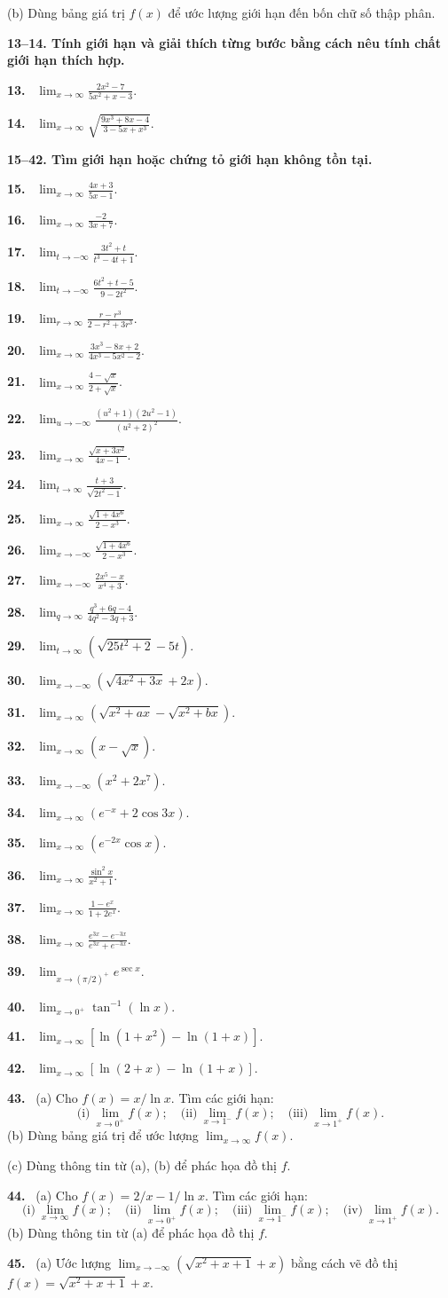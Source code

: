 \documentclass[12pt,a4paper]{article}
\newcommand{\bt}[1]{\par\smallskip\noindent\textbf{#1.}\ }
\newcommand{\group}[1]{\par\medskip\noindent\textbf{#1}\par\nopagebreak[4]}
\begin{document}
(b) Dùng bảng giá trị $f(x)$ để ước lượng giới hạn đến bốn chữ số thập phân.
\group{13–14. Tính giới hạn và giải thích từng bước bằng cách nêu tính chất giới hạn thích hợp.}
\bt{13} $\displaystyle\lim_{x\to\infty}\frac{2x^2-7}{5x^2+x-3}$.
\bt{14} $\displaystyle\lim_{x\to\infty}\sqrt{\frac{9x^3+8x-4}{3-5x+x^3}}$.
\group{15–42. Tìm giới hạn hoặc chứng tỏ giới hạn không tồn tại.}
\bt{15} $\displaystyle\lim_{x\to\infty}\frac{4x+3}{5x-1}$.
\bt{16} $\displaystyle\lim_{x\to\infty}\frac{-2}{3x+7}$.
\bt{17} $\displaystyle\lim_{t\to-\infty}\frac{3t^2+t}{t^3-4t+1}$.
\bt{18} $\displaystyle\lim_{t\to-\infty}\frac{6t^2+t-5}{9-2t^2}$.
\bt{19} $\displaystyle\lim_{r\to\infty}\frac{r-r^3}{2-r^2+3r^3}$.
\bt{20} $\displaystyle\lim_{x\to\infty}\frac{3x^3-8x+2}{4x^3-5x^2-2}$.
\bt{21} $\displaystyle\lim_{x\to\infty}\frac{4-\sqrt x}{2+\sqrt x}$.
\bt{22} $\displaystyle\lim_{u\to-\infty}\frac{(u^2+1)(2u^2-1)}{(u^2+2)^2}$.
\bt{23} $\displaystyle\lim_{x\to\infty}\frac{\sqrt{x+3x^2}}{4x-1}$.
\bt{24} $\displaystyle\lim_{t\to\infty}\frac{t+3}{\sqrt{2t^2-1}}$.
\bt{25} $\displaystyle\lim_{x\to\infty}\frac{\sqrt{1+4x^6}}{2-x^3}$.
\bt{26} $\displaystyle\lim_{x\to-\infty}\frac{\sqrt{1+4x^6}}{2-x^3}$.
\bt{27} $\displaystyle\lim_{x\to-\infty}\frac{2x^5-x}{x^4+3}$.
\bt{28} $\displaystyle\lim_{q\to\infty}\frac{q^3+6q-4}{4q^2-3q+3}$.
\bt{29} $\displaystyle\lim_{t\to\infty}(\sqrt{25t^2+2}-5t)$.
\bt{30} $\displaystyle\lim_{x\to-\infty}(\sqrt{4x^2+3x}+2x)$.
\bt{31} $\displaystyle\lim_{x\to\infty}(\sqrt{x^2+ax}-\sqrt{x^2+bx})$.
\bt{32} $\displaystyle\lim_{x\to\infty}(x-\sqrt x)$.
\bt{33} $\displaystyle\lim_{x\to-\infty}(x^2+2x^7)$.
\bt{34} $\displaystyle\lim_{x\to\infty}(e^{-x}+2\cos3x)$.
\bt{35} $\displaystyle\lim_{x\to\infty}(e^{-2x}\cos x)$.
\bt{36} $\displaystyle\lim_{x\to\infty}\frac{\sin^2x}{x^2+1}$.
\bt{37} $\displaystyle\lim_{x\to\infty}\frac{1-e^x}{1+2e^x}$.
\bt{38} $\displaystyle\lim_{x\to\infty}\frac{e^{3x}-e^{-3x}}{e^{3x}+e^{-3x}}$.
\bt{39} $\displaystyle\lim_{x\to(\pi/2)^+}e^{\sec x}$.
\bt{40} $\displaystyle\lim_{x\to0^+}\tan^{-1}(\ln x)$.
\bt{41} $\displaystyle\lim_{x\to\infty}[\ln(1+x^2)-\ln(1+x)]$.
\bt{42} $\displaystyle\lim_{x\to\infty}[\ln(2+x)-\ln(1+x)]$.
\bt{43} (a) Cho $f(x)=x/\ln x$. Tìm các giới hạn:
\[\text{(i)}\ \lim_{x\to0^+}f(x);\quad\text{(ii)}\ \lim_{x\to1^-}f(x);\quad\text{(iii)}\ \lim_{x\to1^+}f(x).\]
(b) Dùng bảng giá trị để ước lượng $\lim_{x\to\infty}f(x)$.

(c) Dùng thông tin từ (a), (b) để phác họa đồ thị $f$.
\bt{44} (a) Cho $f(x)=2/x-1/\ln x$. Tìm các giới hạn:
\[\text{(i)}\ \lim_{x\to\infty}f(x);\quad\text{(ii)}\ \lim_{x\to0^+}f(x);\quad\text{(iii)}\ \lim_{x\to1^-}f(x);\quad\text{(iv)}\ \lim_{x\to1^+}f(x).\]
(b) Dùng thông tin từ (a) để phác họa đồ thị $f$.
\bt{45} (a) Ước lượng $\lim_{x\to-\infty}(\sqrt{x^2+x+1}+x)$ bằng cách vẽ đồ thị $f(x)=\sqrt{x^2+x+1}+x$.
\end{document}
